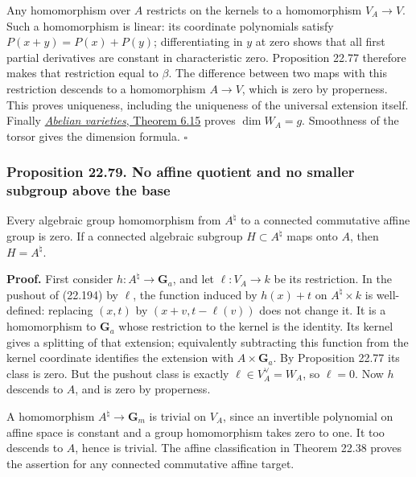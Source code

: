 \documentclass[
  11pt,
  a4paper,
]{article}
\begin{document}
Any homomorphism over \(A\) restricts on the kernels to a homomorphism
\(V_A\to V\). Such a homomorphism is linear: its coordinate polynomials
satisfy \(P(x+y)=P(x)+P(y)\); differentiating in \(y\) at zero shows
that all first partial derivatives are constant in characteristic zero.
Proposition 22.77 therefore makes that restriction equal to \(\beta\).
The difference between two maps with this restriction descends to a
homomorphism \(A\to V\), which is zero by properness. This proves
uniqueness, including the uniqueness of the universal extension itself.
Finally
\href{https://github.com/KokunoYumeto/open-math-courses-public/blob/146dc81802e69cf262fb6cc65c1b9f74e71f4625/docs/courses/AG-GS/src/abelian-varieties.md\#the-representing-dual-and-its-universal-bundle}{\emph{Abelian
varieties}, Theorem 6.15} proves \(\dim W_A=g\). Smoothness of the
torsor gives the dimension formula. \(\square\)

\subsubsection{Proposition 22.79. No affine quotient and no smaller
subgroup above the
base}\label{proposition-22.79.-no-affine-quotient-and-no-smaller-subgroup-above-the-base}

Every algebraic group homomorphism from \(A^\natural\) to a connected
commutative affine group is zero. If a connected algebraic subgroup
\(H\subset A^\natural\) maps onto \(A\), then \(H=A^\natural\).

\textbf{Proof.} First consider \(h:A^\natural\to\mathbf G_a\), and let
\(\ell:V_A\to k\) be its restriction. In the pushout of (22.194) by
\(\ell\), the function induced by \(h(x)+t\) on \(A^\natural\times k\)
is well-defined: replacing \((x,t)\) by \((x+v,t-\ell(v))\) does not
change it. It is a homomorphism to \(\mathbf G_a\) whose restriction to
the kernel is the identity. Its kernel gives a splitting of that
extension; equivalently subtracting this function from the kernel
coordinate identifies the extension with \(A\times\mathbf G_a\). By
Proposition 22.77 its class is zero. But the pushout class is exactly
\(\ell\in V_A^\vee=W_A\), so \(\ell=0\). Now \(h\) descends to \(A\),
and is zero by properness.

A homomorphism \(A^\natural\to\mathbf G_m\) is trivial on \(V_A\), since
an invertible polynomial on affine space is constant and a group
homomorphism takes zero to one. It too descends to \(A\), hence is
trivial. The affine classification in Theorem 22.38 proves the assertion
for any connected commutative affine target.
\end{document}
